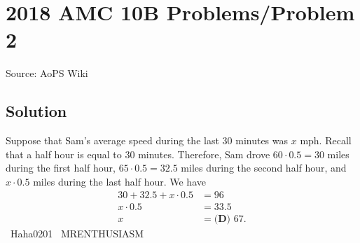 \documentclass[12pt]{article}
\begin{document}
\section*{{2018 AMC 10B Problems/Problem 2}}
Source: AoPS Wiki

\subsection*{Solution}
Suppose that Sam's average speed during the last $30$ minutes was $x$ mph. Recall that a half hour is equal to $30$ minutes. Therefore, Sam drove $60\cdot0.5=30$ miles during the first half hour, $65\cdot0.5=32.5$ miles during the second half hour, and $x\cdot0.5$ miles during the last half hour. We have \begin{align*} 30+32.5+x\cdot0.5&=96 \\ x\cdot0.5&=33.5 \\ x&=\boxed{\textbf{(D) } 67}. \end{align*} ~Haha0201 ~MRENTHUSIASM
\end{document}
